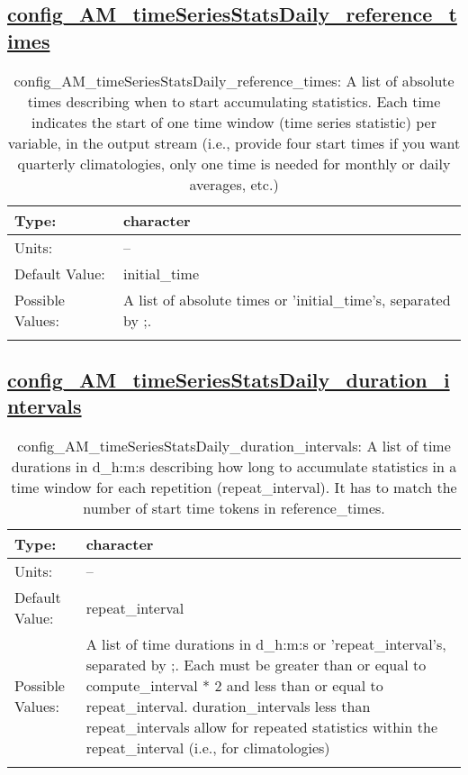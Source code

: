 \subsection[config\_AM\_timeSeriesStatsDaily\_reference\_times]{\hyperref[sec:nm_tab_AM_timeSeriesStatsDaily]{config\_AM\_timeSeriesStatsDaily\_reference\_times}}
\label{subsec:nm_sec_config_AM_timeSeriesStatsDaily_reference_times}
\begin{center}
\begin{longtable}{| p{2.0in} || p{4.0in} |}
    \hline
    Type: & character \\
    \hline
    Units: & -- \\
    \hline
    Default Value: & initial\_time \\
    \hline
    Possible Values: & A list of absolute times or 'initial\_time's, separated by ;. \\
    \hline
    \caption{config\_AM\_timeSeriesStatsDaily\_reference\_times: A list of absolute times describing when to start accumulating statistics. Each time indicates the start of one time window (time series statistic) per variable, in the output stream (i.e., provide four start times if you want quarterly climatologies, only one time is needed for monthly or daily averages, etc.)}
\end{longtable}
\end{center}
\subsection[config\_AM\_timeSeriesStatsDaily\_duration\_intervals]{\hyperref[sec:nm_tab_AM_timeSeriesStatsDaily]{config\_AM\_timeSeriesStatsDaily\_duration\_intervals}}
\label{subsec:nm_sec_config_AM_timeSeriesStatsDaily_duration_intervals}
\begin{center}
\begin{longtable}{| p{2.0in} || p{4.0in} |}
    \hline
    Type: & character \\
    \hline
    Units: & -- \\
    \hline
    Default Value: & repeat\_interval \\
    \hline
    Possible Values: & A list of time durations in d\_h:m:s or 'repeat\_interval's, separated by ;. Each must be greater than or equal to compute\_interval * 2 and less than or equal to repeat\_interval. duration\_intervals less than repeat\_intervals allow for repeated statistics within the repeat\_interval (i.e., for climatologies) \\
    \hline
    \caption{config\_AM\_timeSeriesStatsDaily\_duration\_intervals: A list of time durations in d\_h:m:s describing how long to accumulate statistics in a time window for each repetition (repeat\_interval). It has to match the number of start time tokens in reference\_times.}
\end{longtable}
\end{center}
